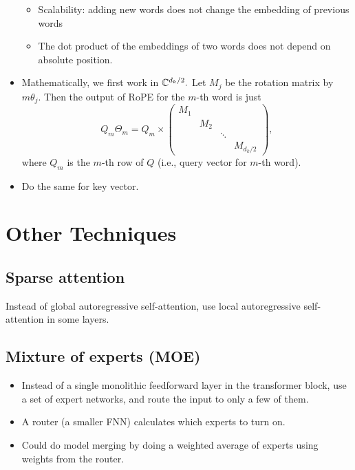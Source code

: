 \begin{itemize}
\begin{itemize}
            \item Scalability: adding new words does not change the embedding of previous words
            \item The dot product of the embeddings of two words does not depend on absolute position.
        \end{itemize}
    \item Mathematically, we first work in $\mathbb{C}^{d_k/2}.$ Let $M_j$ be the rotation matrix by $m \theta_j.$ Then the output of RoPE for the $m$-th word is just
    \begin{equation*}
        Q_m\Theta_m = Q_m \times
        \begin{pmatrix}
        M_1 & & & \\
        & M_2 & & \\
        & & \ddots & \\
        & & & M_{d_k/2}
        \end{pmatrix},
    \end{equation*}
    where $Q_m$ is the $m$-th row of $Q$ (i.e., query vector for $m$-th word).
    \item Do the same for key vector.
\end{itemize}

\section{Other Techniques}
\subsection{Sparse attention}
Instead of global autoregressive self-attention, use local autoregressive self-attention in some layers.

\subsection{Mixture of experts (MOE)}
\begin{itemize}
    \item Instead of a single monolithic feedforward layer in the transformer block, use a set of expert networks, and route the input to only a few of them.
    \item A router (a smaller FNN) calculates which experts to turn on.
    \item Could do model merging by doing a weighted average of experts using weights from the router.
\end{itemize}